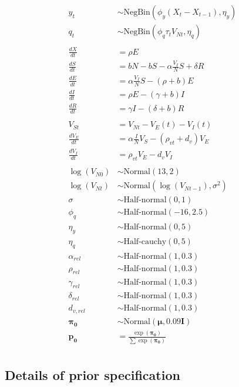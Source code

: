 \documentclass[10pt,letterpaper]{article}
\begin{document}
\begin{align}
y_t & \sim \text{NegBin}(\phi_y (X_t - X_{t-1}), \eta_y)\\
q_t & \sim \text{NegBin}(\phi_q \tau_t V_{Nt}, \eta_q)\\
\\ 
\frac{dX}{dt} &= \rho E \\
\frac{dS}{dt} &= bN - bS - \alpha \frac{V_{I}}{N} S + \delta R\\
\frac{dE}{dt} &= \alpha \frac{V_{I}}{N} S - (\rho + b)E\\
\frac{dI}{dt} &= \rho E - (\gamma + b)I\\
\frac{dR}{dt} &= \gamma I - (\delta + b)R\\
\\
V_{St} & = V_{Nt} - V_E(t) - V_I(t)\\
\frac{dV_E}{dt} &= \alpha \frac{I}{N} V_S - (\rho_{vt} + d_v)V_E\\
\frac{dV_I}{dt} &= \rho_{vt} V_E - d_v V_I\\
\\
\log(V_{N0}) & \sim \text{Normal}(13, 2)\\
\log(V_{Nt}) & \sim \text{Normal}(\log(V_{Nt-1}), \sigma^2)\\
\sigma & \sim \text{Half-normal}(0, 1)\\
\phi_q & \sim \text{Half-normal}(-16, 2.5)\\
\eta_y &\sim \text{Half-normal}(0, 5)\\
\eta_q & \sim \text{Half-cauchy}(0, 5)\\
\alpha_{rel} & \sim \text{Half-normal}(1, 0.3)\\
\rho_{rel} & \sim \text{Half-normal}(1, 0.3)\\
\gamma_{rel} & \sim \text{Half-normal}(1, 0.3)\\
\delta_{rel} & \sim \text{Half-normal}(1, 0.3)\\
d_{v,rel} & \sim \text{Half-normal}(1, 0.3)\\
\mathbf{\pi_{0}} & \sim \text{Normal}(\mathbf{\mu}, 0.09\mathbf{I})\\
\mathbf{p_0} & = \frac{\exp(\mathbf{\pi_0})}{\sum \exp(\mathbf{\pi_0})} \\
\end{align}

\subsection*{Details of prior specification}
\end{document}
